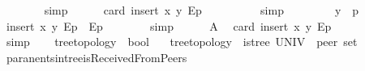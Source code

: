 \begin{isabellebody}
\ \ \ \ \ \ \isamarkupfalse%
\ simp\isanewline
\ \ \ \ \isamarkupfalse%
\ {\isachardoublequoteopen}card\ {\isacharparenleft}{\kern0pt}insert\ {\isacharparenleft}{\kern0pt}x{\isacharcomma}{\kern0pt}\ y{\isacharparenright}{\kern0pt}\ E{\isasymlangle}{\isasymrightarrow}p{\isasymrangle}{\isacharparenright}{\kern0pt}\ {\isasymle}\ {}{\isachardoublequoteclose}\isanewline
\ \ \ \ \ \ \isamarkupfalse%
\ simp\isanewline
\ \ \isamarkupfalse%
\isanewline
\ \ \ \ \isamarkupfalse%
\ {\isachardoublequoteopen}y\ {\isasymnoteq}\ p{\isachardoublequoteclose}\isanewline
\ \ \ \ \isamarkupfalse%
\ {\isachardoublequoteopen}insert\ {\isacharparenleft}{\kern0pt}x{\isacharcomma}{\kern0pt}\ y{\isacharparenright}{\kern0pt}\ E{\isasymlangle}{\isasymrightarrow}p{\isasymrangle}\ {\isacharequal}{\kern0pt}\ E{\isasymlangle}{\isasymrightarrow}p{\isasymrangle}{\isachardoublequoteclose}\isanewline
\ \ \ \ \ \ \isamarkupfalse%
\ simp\isanewline
\ \ \ \ \isamarkupfalse%
\ A{}\ \isamarkupfalse%
\ {\isachardoublequoteopen}card\ {\isacharparenleft}{\kern0pt}insert\ {\isacharparenleft}{\kern0pt}x{\isacharcomma}{\kern0pt}\ y{\isacharparenright}{\kern0pt}\ E{\isasymlangle}{\isasymrightarrow}p{\isasymrangle}{\isacharparenright}{\kern0pt}\ {\isasymle}\ {}{\isachardoublequoteclose}\isanewline
\ \ \ \ \ \ \isamarkupfalse%
\ simp\isanewline
\ \ \isamarkupfalse%
\isanewline
{}\isamarkupfalse%
%
\endisatagproof
{\isafoldproof}%
%
\isadelimproof
\isanewline
%
\endisadelimproof
\isanewline
{}\isamarkupfalse%
\ tree{\isacharunderscore}{\kern0pt}topology\ {\isacharcolon}{\kern0pt}{\isacharcolon}{\kern0pt}\ {\isachardoublequoteopen}bool{\isachardoublequoteclose}\ \isanewline
\ \ {\isachardoublequoteopen}tree{\isacharunderscore}{\kern0pt}topology\ {\isasymequiv}\ is{\isacharunderscore}{\kern0pt}tree\ {\isacharparenleft}{\kern0pt}UNIV\ {\isacharcolon}{\kern0pt}{\isacharcolon}{\kern0pt}\ {\isacharprime}{\kern0pt}peer\ set{\isacharparenright}{\kern0pt}\ {\isacharparenleft}{\kern0pt}{\isasymG}{\isacharparenright}{\kern0pt}{\isachardoublequoteclose}\isanewline
\isanewline
{}\isamarkupfalse%
\ paranents{\isacharunderscore}{\kern0pt}in{\isacharunderscore}{\kern0pt}tree{\isacharunderscore}{\kern0pt}is{\isacharunderscore}{\kern0pt}ReceivedFromPeers{\isacharcolon}{\kern0pt}\isanewline

\end{isabellebody}
